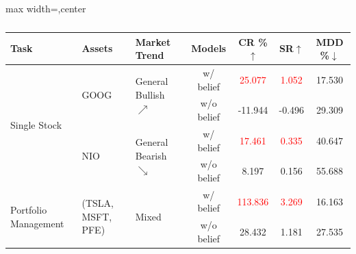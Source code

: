 \begin{table}[ht]
\centering
\begin{adjustbox}{max width=\dimexpr\textwidth,center}
\begin{tabular}{p{2cm}p{1.8cm}lcccc}
\toprule
\textbf{Task} & \textbf{Assets} & \textbf{Market Trend} & \textbf{Models} & \textbf{CR \%}$\uparrow$ & \textbf{SR}$\uparrow$ & \textbf{MDD \%}$\downarrow$ \\
\midrule
\multirow{4}{=}{Single Stock} 
    & \multirow{2}{=}{GOOG} & \multirow{2}{*}{General Bullish $\nearrow$} & w/ belief  & \textcolor{red}{25.077} & \textcolor{red}{1.052} & 17.530 \\
    & & & w/o belief & -11.944 & -0.496 & 29.309\\
    & \multirow{2}{=}{NIO} & \multirow{2}{*}{General Bearish $\searrow$} & w/ belief & \textcolor{red}{17.461} & \textcolor{red}{0.335} & 40.647 \\
    & & & w/o belief & 8.197 & 0.156 & 55.688\\
\midrule
\multirow{2}{=}{Portfolio Management} 
    & \multirow{2}{=}{(TSLA, MSFT, PFE)} & \multirow{2}{*}{Mixed} & w/ belief & \textcolor{red}{113.836} & \textcolor{red}{3.269}& 16.163\\
    & & & w/o belief & 28.432 & 1.181 & 27.535  \\
\bottomrule
\end{tabular}
\end{adjustbox}
\caption{}
\label{exp2:performance_overview_belief}
\end{table}

